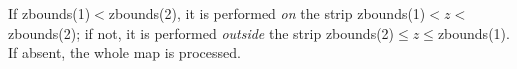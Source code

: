 If zbounds(1)$<$zbounds(2), it is
performed {\em on} the strip zbounds(1)$<z<$zbounds(2); if not,
it is performed {\em outside} the strip
zbounds(2)$\le z \le$zbounds(1). %
If absent, the whole map is processed.
